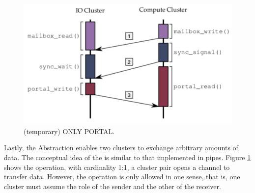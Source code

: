 			\begin{figure}[h]
				\centering
				\includegraphics[width=.7\textwidth]{images/conceptual-sync.png}

				\caption{
					(temporary) ONLY PORTAL.
				}\par
				\label{fig.conpt_portal}
			\end{figure}

			Lastly, the \portal Abstraction enables two clusters to exchange arbitrary
			amounts of data.
			The conceptual idea of ​​the \portal is similar to that implemented in \posix pipes.
			Figure \ref{fig.conpt_portal} shows the \portal operation, with cardinality
			1:1, a cluster pair opens a channel to transfer data.
			However, the operation is only allowed in one sense, that is, one
			cluster must assume the role of the sender and the other of the receiver.
